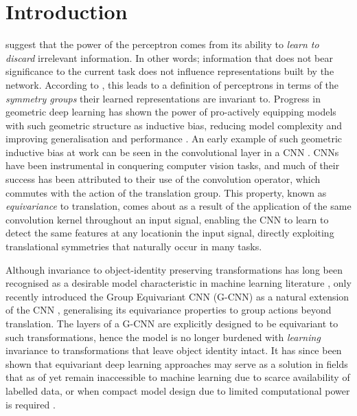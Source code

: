 \documentclass[nohyperref]{article}
\theoremstyle{plain}
\theoremstyle{definition}
\theoremstyle{remark}
\begin{document}
\section{Introduction}
\citet{minsky1988perceptrons} suggest that the power of the perceptron comes from its ability to \textit{learn to discard} irrelevant information. In other words; information that does not bear significance to the current task does not influence representations built by the network. According to \citet{minsky1988perceptrons}, this leads to a definition of perceptrons in terms of the \textit{symmetry groups} their learned representations are invariant to. Progress in geometric deep learning has shown the power of pro-actively equipping models with such geometric structure as inductive bias, reducing model complexity and improving generalisation and performance \citep{bronstein2017geometric}. An early example of such geometric inductive bias at work can be seen in the convolutional layer in a CNN \citep{lecun1998gradient}. CNNs have been instrumental in conquering computer vision tasks, and much of their success has been attributed to their use of the convolution operator, which commutes with the action of the translation group. This property, known as \textit{equivariance} to translation, comes about as a result of the application of the same convolution kernel throughout an input signal, enabling the CNN to learn to detect the same features at any location\break in the input signal, directly exploiting translational symmetries that naturally occur in many tasks.

Although invariance to object-identity preserving transformations has long been recognised as a desirable model characteristic in machine learning literature \citep{kondor2008group, cohen2013learning, sifre2014rigid}, only recently \citet{cohen2016group} introduced the Group Equivariant CNN (G-CNN) as a natural extension of the CNN \citep{lecun1998gradient}, generalising its equivariance properties to group actions beyond translation. The layers of a G-CNN are explicitly designed to be equivariant to such transformations, hence the model is no longer burdened with \textit{learning} invariance to transformations that leave object identity intact. It has since been shown that equivariant deep learning approaches may serve as a solution in fields that as of yet remain inaccessible to machine learning due to scarce availability of labelled data, or when compact model design due to limited computational power is required \citep{winkels20183d, linmans2018sample,bekkers2019b}.
\end{document}
